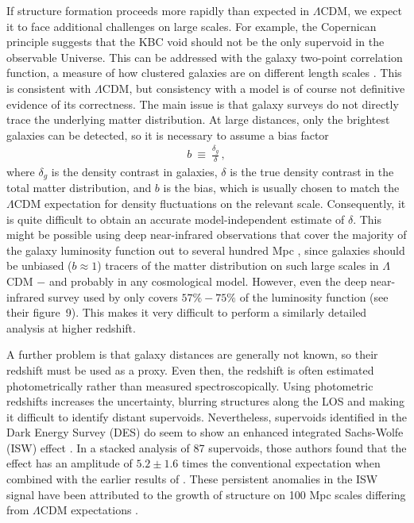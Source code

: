 \documentclass[fleqn,usenatbib,useAMS]{mnras} %
\begin{document}
If structure formation proceeds more rapidly than expected in $\Lambda$CDM, we expect it to face additional challenges on large scales. For example, the Copernican principle suggests that the KBC void should not be the only supervoid in the observable Universe. This can be addressed with the galaxy two-point correlation function, a measure of how clustered galaxies are on different length scales \citep{Anderson_2012}. This is consistent with $\Lambda$CDM, but consistency with a model is of course not definitive evidence of its correctness. The main issue is that galaxy surveys do not directly trace the underlying matter distribution. At large distances, only the brightest galaxies can be detected, so it is necessary to assume a bias factor
\begin{eqnarray}
	b ~\equiv~ \frac{\delta_g}{\delta} \, ,
	\label{Bias_factor}
\end{eqnarray}
where $\delta_g$ is the density contrast in galaxies, $\delta$ is the true density contrast in the total matter distribution, and $b$ is the bias, which is usually chosen to match the $\Lambda$CDM expectation for density fluctuations on the relevant scale. Consequently, it is quite difficult to obtain an accurate model-independent estimate of $\delta$. This might be possible using deep near-infrared observations that cover the majority of the galaxy luminosity function out to several hundred Mpc \citep[as done by][]{Keenan_2013}, since galaxies should be unbiased ($b \approx 1$) tracers of the matter distribution on such large scales in $\Lambda$CDM \citep{Peebles_2001} $-$ and probably in any cosmological model. However, even the deep near-infrared survey used by \citet{Keenan_2013} only covers $57\%-75\%$ of the luminosity function (see their figure~9). This makes it very difficult to perform a similarly detailed analysis at higher redshift.

A further problem is that galaxy distances are generally not known, so their redshift must be used as a proxy. Even then, the redshift is often estimated photometrically rather than measured spectroscopically. Using photometric redshifts increases the uncertainty, blurring structures along the LOS and making it difficult to identify distant supervoids. Nevertheless, supervoids identified in the Dark Energy Survey (DES) do seem to show an enhanced integrated Sachs-Wolfe (ISW) effect \citep{Kovacs_2019}. In a stacked analysis of 87 supervoids, those authors found that the effect has an amplitude of ${5.2 \pm 1.6}$ times the conventional expectation when combined with the earlier results of \citet{Kovacs_2018}. These persistent anomalies in the ISW signal have been attributed to the growth of structure on 100 Mpc scales differing from $\Lambda$CDM expectations \citep{Kovacs_2022_ISW}.
\end{document}
